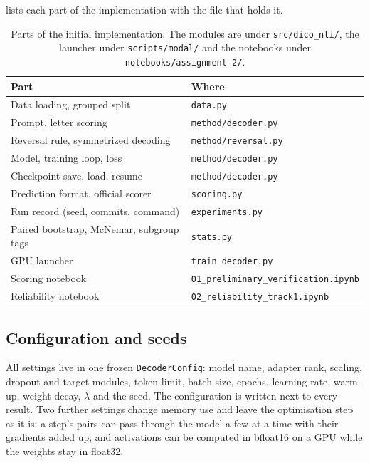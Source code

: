  lists each part of the implementation with the file that holds it.

\begin{table}[H]
\centering
\small
\begin{tabular}{@{}N{0.50\columnwidth}N{0.44\columnwidth}@{}}
\toprule
Part & Where \\
\midrule
Data loading, grouped split & \texttt{data.py} \\
Prompt, letter scoring & \texttt{method/decoder.py} \\
Reversal rule, symmetrized decoding & \texttt{method/reversal.py} \\
Model, training loop, loss & \texttt{method/decoder.py} \\
Checkpoint save, load, resume & \texttt{method/decoder.py} \\
Prediction format, official scorer & \texttt{scoring.py} \\
Run record (seed, commits, command) & \texttt{experiments.py} \\
Paired bootstrap, McNemar, subgroup tags & \texttt{stats.py} \\
GPU launcher & \texttt{train\_decoder.py} \\
Scoring notebook & \texttt{01\_preliminary\_verification.ipynb} \\
Reliability notebook & \texttt{02\_reliability\_track1.ipynb} \\
\bottomrule
\end{tabular}
\caption{Parts of the initial implementation. The modules are under \texttt{src/dico\_nli/}, the launcher under \texttt{scripts/modal/} and the notebooks under \texttt{notebooks/assignment-2/}.}
\label{tab:implementation}
\end{table}

\subsection{Configuration and seeds}
All settings live in one frozen \texttt{DecoderConfig}: model name, adapter rank, scaling, dropout and target modules, token limit, batch size, epochs, learning rate, warm-up, weight decay, $\lambda$ and the seed. The configuration is written next to every result. Two further settings change memory use and leave the optimisation step as it is: a step's pairs can pass through the model a few at a time with their gradients added up, and activations can be computed in bfloat16 on a GPU while the weights stay in float32.

